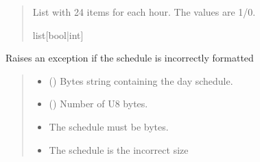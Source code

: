 \documentclass[letterpaper,10pt,english]{sphinxmanual}
\begin{document}
\begin{fulllineitems}
\begin{fulllineitems}
\begin{quote}
\begin{description}
\begin{itemize}
\end{itemize}

\sphinxAtStartPar
List with 24 items for each hour. The values are 1/0.

\sphinxAtStartPar
list{[}bool|int{]}

\end{description}\end{quote}

\end{fulllineitems}


\begin{fulllineitems}
\label{\detokenize{Morelia.Devices:Morelia.Devices.PodDevice_8229.Pod8229._Validate_Schedule}}
\pysigstartsignatures
{}
\pysigstopsignatures
\sphinxAtStartPar
Raises an exception if the schedule is incorrectly formatted
\begin{quote}\begin{description}
\begin{itemize}
\item {} 
\sphinxAtStartPar
{} () \textendash{} Bytes string containing the day schedule.

\item {} 
\sphinxAtStartPar
{} () \textendash{} Number of U8 bytes.

\end{itemize}

\begin{itemize}
\item {} 
\sphinxAtStartPar
{} \textendash{} The schedule must be bytes.

\item {} 
\sphinxAtStartPar
{} \textendash{} The schedule is the incorrect size


\end{itemize}
\end{description}
\end{quote}
\end{fulllineitems}
\end{fulllineitems}
\end{document}
